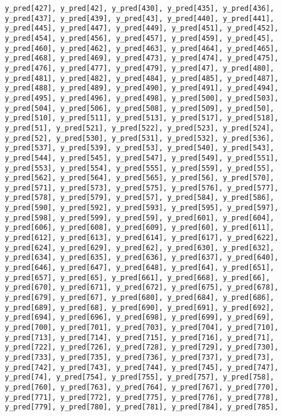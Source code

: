 \documentclass[
  letterpaper,
  DIV=11,
  numbers=noendperiod]{scrartcl}
\begin{document}
\begin{verbatim}
y_pred[427], y_pred[42], y_pred[430], y_pred[435], y_pred[436],
y_pred[437], y_pred[439], y_pred[43], y_pred[440], y_pred[441],
y_pred[445], y_pred[447], y_pred[449], y_pred[451], y_pred[452],
y_pred[454], y_pred[456], y_pred[457], y_pred[459], y_pred[45],
y_pred[460], y_pred[462], y_pred[463], y_pred[464], y_pred[465],
y_pred[468], y_pred[469], y_pred[473], y_pred[474], y_pred[475],
y_pred[476], y_pred[477], y_pred[479], y_pred[47], y_pred[480],
y_pred[481], y_pred[482], y_pred[484], y_pred[485], y_pred[487],
y_pred[488], y_pred[489], y_pred[490], y_pred[491], y_pred[494],
y_pred[495], y_pred[496], y_pred[498], y_pred[500], y_pred[503],
y_pred[504], y_pred[506], y_pred[508], y_pred[509], y_pred[50],
y_pred[510], y_pred[511], y_pred[513], y_pred[517], y_pred[518],
y_pred[51], y_pred[521], y_pred[522], y_pred[523], y_pred[524],
y_pred[52], y_pred[530], y_pred[531], y_pred[532], y_pred[536],
y_pred[537], y_pred[539], y_pred[53], y_pred[540], y_pred[543],
y_pred[544], y_pred[545], y_pred[547], y_pred[549], y_pred[551],
y_pred[553], y_pred[554], y_pred[555], y_pred[559], y_pred[55],
y_pred[562], y_pred[564], y_pred[565], y_pred[56], y_pred[570],
y_pred[571], y_pred[573], y_pred[575], y_pred[576], y_pred[577],
y_pred[578], y_pred[579], y_pred[57], y_pred[584], y_pred[586],
y_pred[590], y_pred[592], y_pred[593], y_pred[595], y_pred[597],
y_pred[598], y_pred[599], y_pred[59], y_pred[601], y_pred[604],
y_pred[606], y_pred[608], y_pred[609], y_pred[60], y_pred[611],
y_pred[612], y_pred[613], y_pred[614], y_pred[617], y_pred[622],
y_pred[624], y_pred[629], y_pred[62], y_pred[630], y_pred[632],
y_pred[634], y_pred[635], y_pred[636], y_pred[637], y_pred[640],
y_pred[646], y_pred[647], y_pred[648], y_pred[64], y_pred[651],
y_pred[657], y_pred[65], y_pred[661], y_pred[668], y_pred[66],
y_pred[670], y_pred[671], y_pred[672], y_pred[675], y_pred[678],
y_pred[679], y_pred[67], y_pred[680], y_pred[684], y_pred[686],
y_pred[689], y_pred[68], y_pred[690], y_pred[691], y_pred[692],
y_pred[694], y_pred[696], y_pred[698], y_pred[699], y_pred[69],
y_pred[700], y_pred[701], y_pred[703], y_pred[704], y_pred[710],
y_pred[713], y_pred[714], y_pred[715], y_pred[716], y_pred[71],
y_pred[722], y_pred[726], y_pred[728], y_pred[729], y_pred[730],
y_pred[733], y_pred[735], y_pred[736], y_pred[737], y_pred[73],
y_pred[742], y_pred[743], y_pred[744], y_pred[745], y_pred[747],
y_pred[74], y_pred[754], y_pred[755], y_pred[757], y_pred[758],
y_pred[760], y_pred[763], y_pred[764], y_pred[767], y_pred[770],
y_pred[771], y_pred[772], y_pred[775], y_pred[776], y_pred[778],
y_pred[779], y_pred[780], y_pred[781], y_pred[784], y_pred[785],

\end{verbatim}
\end{document}

